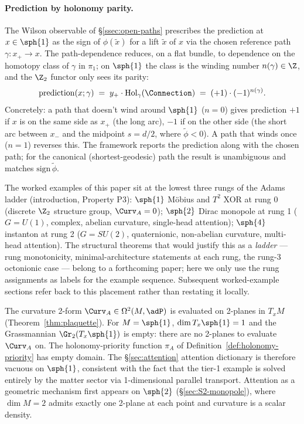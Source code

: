 \paragraph{Prediction by holonomy parity.} The Wilson observable of
\S\ref{ssec:open-paths} prescribes the prediction at $x\in\sph{1}$
as the sign of $\phi(\tilde x)$ for a lift $\tilde x$ of $x$ via the
chosen reference path $\gamma\colon x_+\to x$. The path-dependence
reduces, on a flat bundle, to dependence on the homotopy class of
$\gamma$ in $\pi_1$; on $\sph{1}$ the class is the winding number
$n(\gamma)\in\Z$, and the $\Z_2$ functor only sees its parity:
\[
   \mathrm{prediction}(x;\gamma) \;=\;
   y_+\cdot\mathrm{Hol}_\gamma(\Connection)
   \;=\; (+1)\cdot(-1)^{n(\gamma)}.
\]
Concretely: a path that doesn't wind around $\sph{1}$ ($n=0$) gives
prediction $+1$ if $x$ is on the same side as $x_+$ (the long arc),
$-1$ if on the other side (the short arc between $x_-$ and the
midpoint $s=d/2$, where $\tilde\phi<0$). A path that winds once
($n=1$) reverses this. The framework reports the prediction along
with the chosen path; for the canonical (shortest-geodesic) path
the result is unambiguous and matches $\mathrm{sign}\,\tilde\phi$.

\begin{remark}\label{rem:adams-rungs}
The worked examples of this paper sit at the lowest three rungs of
the Adams ladder (introduction, Property P3): $\sph{1}$ M\"obius and
$T^2$ XOR at rung 0 (discrete $\Z_2$ structure group, $\Curv_A=0$);
$\sph{2}$ Dirac monopole at rung 1 ($G=U(1)$, complex, abelian
curvature, single-head attention); $\sph{4}$ instanton at rung 2
($G=SU(2)$, quaternionic, non-abelian curvature, multi-head
attention). The structural theorems that would justify this as a
\emph{ladder} --- rung monotonicity, minimal-architecture statements
at each rung, the rung-3 octonionic case --- belong to a forthcoming
paper; here we only use the rung assignments as labels for the
example sequence. Subsequent worked-example sections refer back to
this placement rather than restating it locally.
\end{remark}

\begin{remark}
\label{rem:S1-no-attention}
The curvature 2-form $\Curv_A\in\Omega^2(M,\adP)$ is evaluated on
2-planes in $T_xM$ (Theorem~\ref{thm:plaquette}). For $M=\sph{1}$,
$\dim T_x\sph{1}=1$ and the Grassmannian $\Gr_2(T_x\sph{1})$ is
empty: there are no 2-planes to evaluate $\Curv_A$ on. The
holonomy-priority function $\pi_A$ of
Definition~\ref{def:holonomy-priority} has empty domain. The
\S\ref{sec:attention} attention dictionary is therefore vacuous on
$\sph{1}$, consistent with the fact that the tier-1 example is
solved entirely by the matter sector via 1-dimensional parallel
transport. Attention as a geometric mechanism first appears on
$\sph{2}$ (\S\ref{sec:S2-monopole}), where $\dim M=2$ admits exactly
one 2-plane at each point and curvature is a scalar density.
\end{remark}

